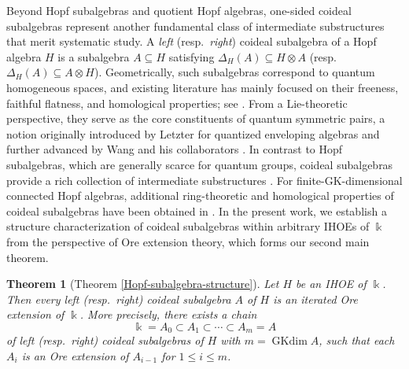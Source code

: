 \documentclass{article}
\theoremstyle{plain}
\newtheorem{thm}{Theorem}[section]
\theoremstyle{definition}
\numberwithin{equation}{section}
\begin{document}
	
	Beyond Hopf subalgebras and quotient Hopf algebras, one-sided coideal subalgebras represent another fundamental class of intermediate substructures that merit systematic study. A \emph{left} (resp.\ \emph{right}) coideal subalgebra of a Hopf algebra $H$ is a subalgebra $A\subseteq H$ satisfying $\Delta_H(A)\subseteq H\otimes A$ (resp.\ $\Delta_H(A)\subseteq A\otimes H$). Geometrically, such subalgebras correspond to quantum homogeneous spaces, and existing literature has mainly focused on their freeness, faithful flatness, and homological properties; see \cite{Ma91,Sk07,LW12,Kr12}. From a Lie-theoretic perspective, they serve as the core constituents of quantum symmetric pairs, a notion originally introduced by Letzter for quantized enveloping algebras \cite{Le02} and further advanced by Wang and his collaborators \cite{Wa23}. In contrast to Hopf subalgebras, which are generally scarce for quantum groups, coideal subalgebras provide a rich collection of intermediate substructures \cite{Kh08,Kh11,KS08,Po09,HS13}. For finite-GK-dimensional connected Hopf algebras, additional ring-theoretic and homological properties of coideal subalgebras have been obtained in \cite{BG16,Zh24}. In the present work, we establish a structure characterization of coideal subalgebras within arbitrary IHOEs of $\Bbbk$ from the perspective of Ore extension theory, which forms our second main theorem.
	
	
	\begin{thm}[Theorem \ref{Hopf-subalgebra-structure}]
		\label{main-theorem-2}
		Let $H$ be an IHOE of $\Bbbk$. Then every left (resp.\ right) coideal subalgebra $A$ of $H$ is an iterated Ore extension of $\Bbbk$. More precisely, there exists a chain
		\[
		\Bbbk =A_{0} \subset A_{1} \subset \cdots \subset A_{m}=A
		\]
		of left (resp.\ right) coideal subalgebras of $H$ with $m=\operatorname{GKdim} A$, such that each $A_i$ is an Ore extension of $A_{i-1}$ for $1\le i\le m$.
	\end{thm}
	
\end{document}
